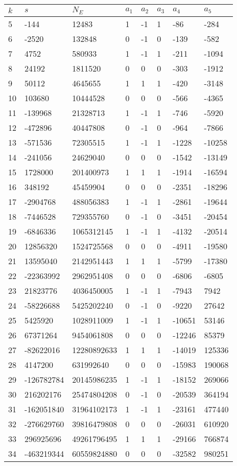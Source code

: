 \documentclass{amsart}
\begin{document}
\begin{longtable}{|l|l|l|lllll|}
\hline
$k$ & $s$ & $N_E$ & $a_1$ & $a_2$ & $a_3$ & $a_4$ & $a_5$\\
\hline
5&-144&12483&1&-1&1&-86&-284\\
6&-2520&132848&0&-1&0&-139&-582\\
7&4752&580933&1&-1&1&-211&-1094\\
8&24192&1811520&0&0&0&-303&-1912\\
9&50112&4645655&1&1&1&-420&-3148\\
10&103680&10444528&0&0&0&-566&-4365\\
11&-139968&21328713&1&-1&1&-746&-5920\\
12&-472896&40447808&0&-1&0&-964&-7866\\
13&-571536&72305515&1&-1&1&-1228&-10258\\
14&-241056&24629040&0&0&0&-1542&-13149\\
15&1728000&201400973&1&1&1&-1914&-16594\\
16&348192&45459904&0&0&0&-2351&-18296\\
17&-2904768&488056383&1&-1&1&-2861&-19644\\
18&-7446528&729355760&0&-1&0&-3451&-20454\\
19&-6846336&1065312145&1&-1&1&-4132&-20514\\
20&12856320&1524725568&0&0&0&-4911&-19580\\
21&13595040&2142951443&1&1&1&-5799&-17380\\
22&-22363992&2962951408&0&0&0&-6806&-6805\\
23&21823776&4036450005&1&-1&1&-7943&7942\\
24&-58226688&5425202240&0&-1&0&-9220&27642\\
25&5425920&1028911009&1&-1&1&-10651&53146\\
26&67371264&9454061808&0&0&0&-12246&85379\\
27&-82622016&12280892633&1&1&1&-14019&125336\\
28&4147200&631992640&0&0&0&-15983&190068\\
29&-126782784&20145986235&1&-1&1&-18152&269066\\
30&216202176&25474804208&0&-1&0&-20539&364194\\
31&-162051840&31964102173&1&-1&1&-23161&477440\\
32&-276629760&39816479808&0&0&0&-26031&610920\\
33&296925696&49261796495&1&1&1&-29166&766874\\
34&-463219344&60559824880&0&0&0&-32582&980251\\

\end{longtable}
\end{document}

